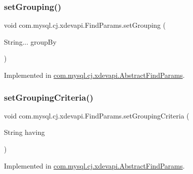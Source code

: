 \mbox{\label{interfacecom_1_1mysql_1_1cj_1_1xdevapi_1_1_find_params_aa46e8ed801545f8754432715812c1bde}} 
\subsubsection{\texorpdfstring{set\+Grouping()}{setGrouping()}}
{\footnotesize\ttfamily void com.\+mysql.\+cj.\+xdevapi.\+Find\+Params.\+set\+Grouping (\begin{DoxyParamCaption}\item[{String...}]{group\+By }\end{DoxyParamCaption})}



Implemented in \mbox{\hyperlink{classcom_1_1mysql_1_1cj_1_1xdevapi_1_1_abstract_find_params_a073faf8afae62dea57a7af9dd31988e8}{com.\+mysql.\+cj.\+xdevapi.\+Abstract\+Find\+Params}}.

\mbox{\label{interfacecom_1_1mysql_1_1cj_1_1xdevapi_1_1_find_params_a5f520024fb2633d0ab42d573c7aeac03}} 
\subsubsection{\texorpdfstring{set\+Grouping\+Criteria()}{setGroupingCriteria()}}
{\footnotesize\ttfamily void com.\+mysql.\+cj.\+xdevapi.\+Find\+Params.\+set\+Grouping\+Criteria (\begin{DoxyParamCaption}\item[{String}]{having }\end{DoxyParamCaption})}



Implemented in \mbox{\hyperlink{classcom_1_1mysql_1_1cj_1_1xdevapi_1_1_abstract_find_params_a8e7b9f8acb811c6da58817a5d09e0444}{com.\+mysql.\+cj.\+xdevapi.\+Abstract\+Find\+Params}}.

